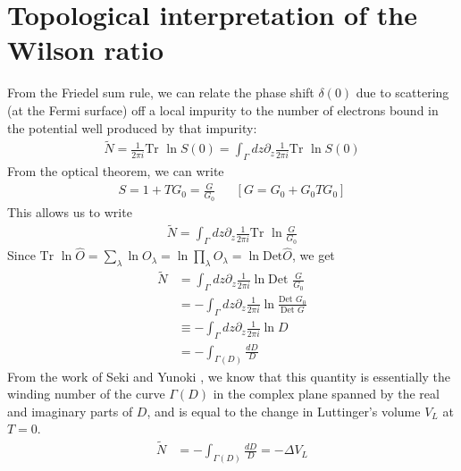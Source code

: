 \documentclass[prb]{revtex4-2}
\begin{document}
\section{Topological interpretation of the Wilson ratio}
From the Friedel sum rule\cite{langer1961friedel}, we can relate the phase shift \(\delta(0)\) due to scattering (at the Fermi surface) off a local impurity to the number of electrons bound in the potential well produced by that impurity:
\begin{equation}\begin{aligned}
\widetilde N = \frac{1}{2\pi i}\text{Tr }\ln S(0) = \int_\Gamma dz\partial_z \frac{1}{2\pi i}\text{Tr }\ln S(0)
\end{aligned}\end{equation}
From the optical theorem, we can write
\begin{equation}\begin{aligned}
	S = 1 + TG_0 = \frac{G}{G_0} && \left[G = G_0 + G_0 T G_0\right]
\end{aligned}\end{equation}
This allows us to write \cite{anirbanurg1}
\begin{equation}\begin{aligned}
\widetilde N = \int_\Gamma dz\partial_z \frac{1}{2\pi i}\text{Tr }\ln \frac{G}{G_0}
\end{aligned}\end{equation}
Since \(\text{Tr }\ln \hat O = \sum_\lambda \ln O_\lambda = \ln \prod_\lambda O_\lambda = \ln \text{Det} \hat O\), we get
\begin{equation}\begin{aligned}
\widetilde N &= \int_\Gamma dz\partial_z \frac{1}{2\pi i}\ln \text{Det } \frac{G}{G_0}\\
      &= -\int_\Gamma dz\partial_z \frac{1}{2\pi i}\ln \frac{\text{Det } G_0}{\text{Det } G}\\
      &\equiv -\int_\Gamma dz\partial_z \frac{1}{2\pi i}\ln D\\
      &= -\int_{\Gamma(D)}\frac{dD}{D}
\end{aligned}\end{equation}
From the work of Seki and Yunoki \cite{seki2017topological}, we know that this quantity is essentially the winding number of the curve \(\Gamma(D)\) in the complex plane spanned by the real and imaginary parts of \(D\), and is equal to the change in Luttinger's volume \(V_L\) at \(T=0\).
\begin{equation}\begin{aligned}
\widetilde N &= -\int_{\Gamma(D)}\frac{dD}{D} = -\Delta V_L
\end{aligned}\end{equation}
\end{document}
